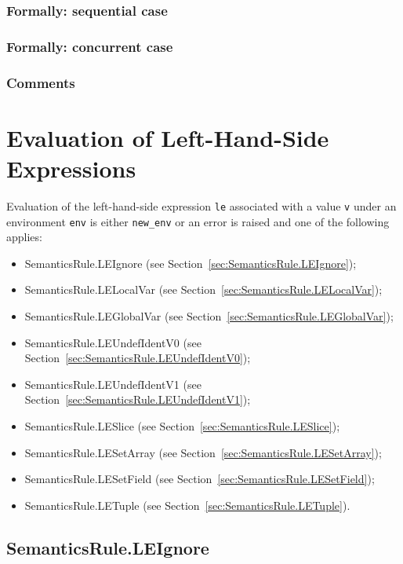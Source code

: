 \documentclass{book}
\begin{document}
  \subsection{Formally: sequential case}
  
  \subsection{Formally: concurrent case}

  \subsection{Comments}


\chapter{Evaluation of Left-Hand-Side Expressions \label{chap:eval_lexpr}}

Evaluation of the left-hand-side expression \texttt{le} associated with a
value \texttt{v} under an environment \texttt{env} is either \texttt{new\_env}
or an error is raised and one of the following applies:
\begin{itemize}
\item SemanticsRule.LEIgnore (see Section~\ref{sec:SemanticsRule.LEIgnore});
\item SemanticsRule.LELocalVar (see Section~\ref{sec:SemanticsRule.LELocalVar});
\item SemanticsRule.LEGlobalVar (see Section~\ref{sec:SemanticsRule.LEGlobalVar});
\item SemanticsRule.LEUndefIdentV0 (see Section~\ref{sec:SemanticsRule.LEUndefIdentV0});
\item SemanticsRule.LEUndefIdentV1 (see Section~\ref{sec:SemanticsRule.LEUndefIdentV1});
\item SemanticsRule.LESlice (see Section~\ref{sec:SemanticsRule.LESlice});
\item SemanticsRule.LESetArray (see Section~\ref{sec:SemanticsRule.LESetArray});
\item SemanticsRule.LESetField (see Section~\ref{sec:SemanticsRule.LESetField});
\item SemanticsRule.LETuple (see Section~\ref{sec:SemanticsRule.LETuple}).
\end{itemize}

\section{SemanticsRule.LEIgnore \label{sec:SemanticsRule.LEIgnore}}
\end{document}
